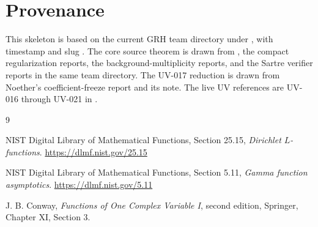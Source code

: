 \documentclass[11pt,a4paper]{amsart}
\theoremstyle{plain}
\theoremstyle{definition}
\begin{document}
\section{Provenance}

This skeleton is based on the current GRH team directory under
, with timestamp  and slug
.
The core source theorem is drawn from , the compact
regularization reports, the background-multiplicity reports, and the Sartre
verifier reports in the same team directory.  The UV-017 reduction is drawn
from Noether's coefficient-freeze report and its
 note.  The live UV references are
UV-016 through UV-021 in .

\begin{thebibliography}{9}

NIST Digital Library of Mathematical Functions, Section 25.15,
\emph{Dirichlet \(L\)-functions}.
\url{https://dlmf.nist.gov/25.15}

NIST Digital Library of Mathematical Functions, Section 5.11,
\emph{Gamma function asymptotics}.
\url{https://dlmf.nist.gov/5.11}

J. B. Conway,
\emph{Functions of One Complex Variable I}, second edition,
Springer, Chapter XI, Section 3.

\end{thebibliography}
\end{document}
